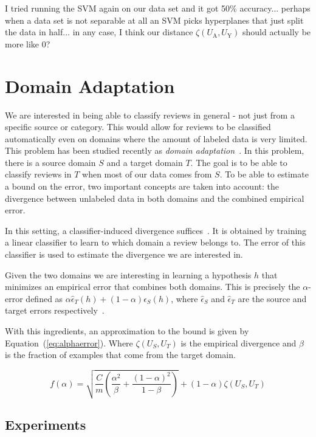 \documentclass[letterpaper]{article}
\begin{document}
I tried running the SVM again on our data set and it got 50\% accuracy... perhaps when a data set is not separable at all an SVM picks hyperplanes that just split the data in half... in any case, I think our distance $\zeta(U_{\textrm{A}}, U_{\textrm{Y}})$ should actually be more like 0?

\section{Domain Adaptation}
\label{sec:background}

We are interested in being able to classify reviews in general - not
just from a specific source or category. This would allow for reviews
to be classified automatically even on domains where the amount of
labeled data is very limited. This problem has been studied recently
as \emph{domain adaptation}~\cite{JennLearnDiffDomains}. In this
problem, there is a source domain $S$ and a target domain $T$. The
goal is to be able to classify reviews in $T$ when most of our data
comes from $S$. To be able to estimate a bound on the error, two
important concepts are taken into account: the divergence between
unlabeled data in both domains and the combined empirical error.

In this setting, a classifier-induced divergence
suffices~\cite{JennLearnDiffDomains}. It is obtained by training a
linear classifier to learn to which domain a review belongs to. The
error of this classifier is used to estimate the divergence we are
interested in.

Given the two domains we are interesting in learning a hypothesis $h$
that minimizes an empirical error that combines both domains. This is
precisely the $\alpha$-error defined as $\alpha \hat
\epsilon_T(h)+(1-\alpha)\hat \epsilon_S(h)$, where $\hat \epsilon_S$
and $\hat \epsilon_T$ are the source and target errors
respectively~\cite{JennLearnDiffDomains}.

With this ingredients, an approximation to the bound is given by
Equation~(\ref{eq:alphaerror}). Where $\zeta(U_S,U_T)$ is the
empirical divergence and $\beta$ is the fraction of examples that come
from the target domain.

\begin{equation}
  \label{eq:alphaerror}
  f(\alpha)=\sqrt{\frac{C}{m}\left(\frac{\alpha^2}{\beta} + \frac{(1-\alpha)^2}{1-\beta}\right)}+(1-\alpha)\zeta(U_S,U_T)
\end{equation}

\subsection{Experiments}
\label{sec:domain-adaptation}
\end{document}
